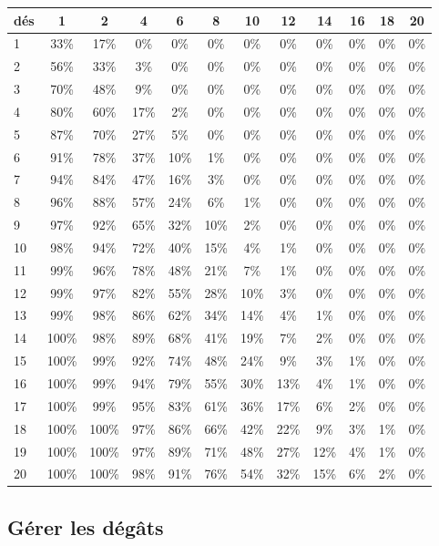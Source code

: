 \begin{landscape}
\begin{multicols}{2}
\noindent
\begin{tabularx}{\columnwidth}{|l|c|c|c|c|c|c|c|c|c|c|c|}
	\hline
	dés &  1 &   2 &   4 &   6 &  8  &  10 &  12 & 14  &  16 & 18 & 20\\
	\hline 
1&33\%&17\%& 0\%& 0\%& 0\%& 0\%& 0\%& 0\%& 0\%& 0\%& 0\%\\
2&56\%&33\%& 3\%& 0\%& 0\%& 0\%& 0\%& 0\%& 0\%& 0\%& 0\%\\
3&70\%&48\%& 9\%& 0\%& 0\%& 0\%& 0\%& 0\%& 0\%& 0\%& 0\%\\
4&80\%&60\%&17\%& 2\%& 0\%& 0\%& 0\%& 0\%& 0\%& 0\%& 0\%\\
5&87\%&70\%&27\%& 5\%& 0\%& 0\%& 0\%& 0\%& 0\%& 0\%& 0\%\\
6&91\%&78\%&37\%&10\%& 1\%& 0\%& 0\%& 0\%& 0\%& 0\%& 0\%\\
7&94\%&84\%&47\%&16\%& 3\%& 0\%& 0\%& 0\%& 0\%& 0\%& 0\%\\
8&96\%&88\%&57\%&24\%& 6\%& 1\%& 0\%& 0\%& 0\%& 0\%& 0\%\\
9&97\%&92\%&65\%&32\%&10\%& 2\%& 0\%& 0\%& 0\%& 0\%& 0\%\\
10&98\%&94\%&72\%&40\%&15\%& 4\%& 1\%& 0\%& 0\%& 0\%& 0\%\\
11&99\%&96\%&78\%&48\%&21\%& 7\%& 1\%& 0\%& 0\%& 0\%& 0\%\\
12&99\%&97\%&82\%&55\%&28\%&10\%& 3\%& 0\%& 0\%& 0\%& 0\%\\
13&99\%&98\%&86\%&62\%&34\%&14\%& 4\%& 1\%& 0\%& 0\%& 0\%\\
14&100\%&98\%&89\%&68\%&41\%&19\%& 7\%& 2\%& 0\%& 0\%& 0\%\\
15&100\%&99\%&92\%&74\%&48\%&24\%& 9\%& 3\%& 1\%& 0\%& 0\%\\
16&100\%&99\%&94\%&79\%&55\%&30\%&13\%& 4\%& 1\%& 0\%& 0\%\\
17&100\%&99\%&95\%&83\%&61\%&36\%&17\%& 6\%& 2\%& 0\%& 0\%\\
18&100\%&100\%&97\%&86\%&66\%&42\%&22\%& 9\%& 3\%& 1\%& 0\%\\
19&100\%&100\%&97\%&89\%&71\%&48\%&27\%&12\%& 4\%& 1\%& 0\%\\
20&100\%&100\%&98\%&91\%&76\%&54\%&32\%&15\%& 6\%& 2\%& 0\%\\	
	\hline
\end{tabularx}



\subsection{Gérer les dégâts}



\end{multicols}
\end{landscape}

